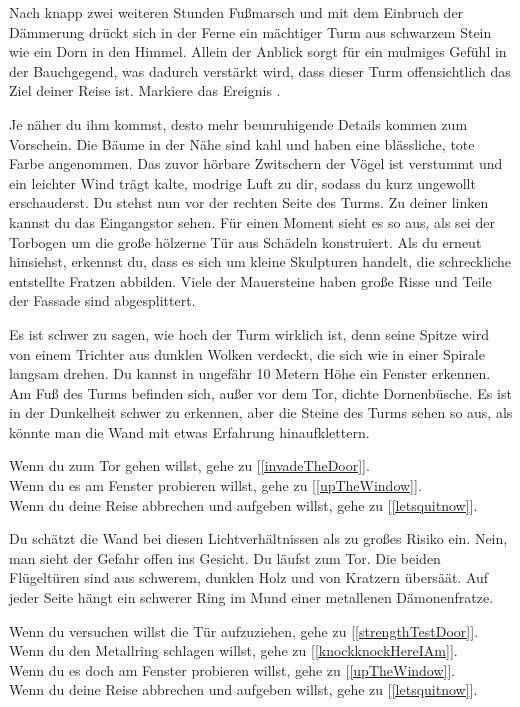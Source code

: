 
Nach knapp zwei weiteren Stunden Fußmarsch und mit dem Einbruch der Dämmerung drückt sich in der Ferne ein mächtiger Turm aus schwarzem Stein wie ein Dorn in den Himmel. Allein der Anblick sorgt für ein mulmiges Gefühl in der Bauchgegend, was dadurch verstärkt wird, dass dieser Turm offensichtlich das Ziel deiner Reise ist. Markiere das Ereignis .

Je näher du ihm kommst, desto mehr beunruhigende Details kommen zum Vorschein. Die Bäume in der Nähe sind kahl und haben eine blässliche, tote Farbe angenommen. Das zuvor hörbare Zwitschern der Vögel ist verstummt und ein leichter Wind trägt kalte, modrige Luft zu dir, sodass du kurz ungewollt erschauderst. Du stehst nun vor der rechten Seite des Turms. Zu deiner linken kannst du das Eingangstor sehen. Für einen Moment sieht es so aus, als sei der Torbogen um die große hölzerne Tür aus Schädeln konstruiert. Als du erneut hinsiehst, erkennst du, dass es sich um kleine Skulpturen handelt, die schreckliche entstellte Fratzen abbilden. Viele der Mauersteine haben große Risse und Teile der Fassade sind abgesplittert.

Es ist schwer zu sagen, wie hoch der Turm wirklich ist, denn seine Spitze wird von einem Trichter aus dunklen Wolken verdeckt, die sich wie in einer Spirale langsam drehen. Du kannst in ungefähr 10 Metern Höhe ein Fenster erkennen. Am Fuß des Turms befinden sich, außer vor dem Tor, dichte Dornenbüsche. Es ist in der Dunkelheit schwer zu erkennen, aber die Steine des Turms sehen so aus, als könnte man die Wand mit etwas Erfahrung hinaufklettern.

Wenn du zum Tor gehen willst, gehe zu [\ref{invadeTheDoor}].
\\Wenn du es am Fenster probieren willst, gehe zu [\ref{upTheWindow}].
\\Wenn du deine Reise abbrechen und aufgeben willst, gehe zu [\ref{letsquitnow}].


Du schätzt die Wand bei diesen Lichtverhältnissen als zu großes Risiko ein. Nein, man sieht der Gefahr offen ins Gesicht. Du läufst zum Tor. Die beiden Flügeltüren sind aus schwerem, dunklen Holz und von Kratzern übersäät. Auf jeder Seite hängt ein schwerer Ring im Mund einer metallenen Dämonenfratze.

Wenn du versuchen willst die Tür aufzuziehen, gehe zu [\ref{strengthTestDoor}].
\\Wenn du den Metallring schlagen willst, gehe zu [\ref{knockknockHereIAm}].
\\Wenn du es doch am Fenster probieren willst, gehe zu [\ref{upTheWindow}].
\\Wenn du deine Reise abbrechen und aufgeben willst, gehe zu [\ref{letsquitnow}].

